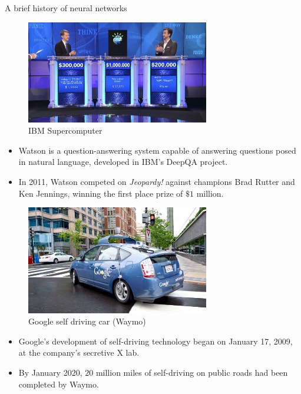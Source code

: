 \begin{vbframe}{A brief history of neural networks}
\begin{figure}
\centering
\includegraphics[width=8cm]{figure/ibmsupercomputer.jpg}
\caption{IBM Supercomputer}
\end{figure}
\footnotesize
\begin{itemize}
\item Watson is a question-answering system capable of answering questions posed in natural language, developed in IBM's DeepQA project.
\vspace{.1cm}
\item In 2011, Watson competed on \textit{Jeopardy!} against champions Brad Rutter and Ken Jennings, winning the first place prize of $\$ 1$ million.
\end{itemize}
\framebreak

\begin{figure}
\centering
\includegraphics[width=8cm]{figure/selfdriving.jpg}
\caption{Google self driving car (Waymo)}
\end{figure}
\footnotesize
\begin{itemize}
\item Google's development of self-driving technology began on January 17, 2009, at the company's secretive X lab.
\vspace{.1cm}
\item By January 2020, $20$ million miles of self-driving on public roads had been completed by Waymo.
\end{itemize}
\framebreak


\end{vbframe}

